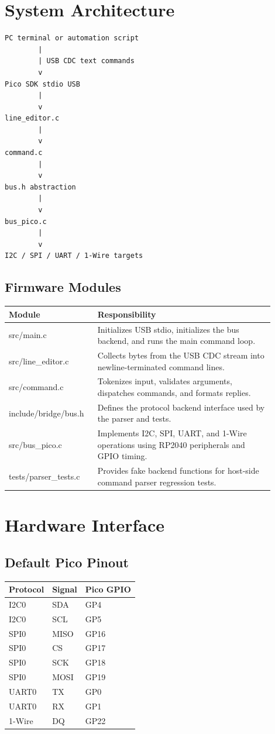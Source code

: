 \documentclass[11pt]{article}
\begin{document}
\section{System Architecture}

\begin{lstlisting}[style=bridge]
PC terminal or automation script
        |
        | USB CDC text commands
        v
Pico SDK stdio USB
        |
        v
line_editor.c
        |
        v
command.c
        |
        v
bus.h abstraction
        |
        v
bus_pico.c
        |
        v
I2C / SPI / UART / 1-Wire targets
\end{lstlisting}

\subsection{Firmware Modules}

\begin{longtable}{>{\ttfamily}p{0.28\linewidth}p{0.62\linewidth}}
\toprule
Module & Responsibility \\
\midrule
src/main.c & Initializes USB stdio, initializes the bus backend, and runs the main command loop. \\
src/line\_editor.c & Collects bytes from the USB CDC stream into newline-terminated command lines. \\
src/command.c & Tokenizes input, validates arguments, dispatches commands, and formats replies. \\
include/bridge/bus.h & Defines the protocol backend interface used by the parser and tests. \\
src/bus\_pico.c & Implements I2C, SPI, UART, and 1-Wire operations using RP2040 peripherals and GPIO timing. \\
tests/parser\_tests.c & Provides fake backend functions for host-side command parser regression tests. \\
\bottomrule
\end{longtable}

\section{Hardware Interface}

\subsection{Default Pico Pinout}

\begin{longtable}{lll}
\toprule
Protocol & Signal & Pico GPIO \\
\midrule
I2C0 & SDA & GP4 \\
I2C0 & SCL & GP5 \\
SPI0 & MISO & GP16 \\
SPI0 & CS & GP17 \\
SPI0 & SCK & GP18 \\
SPI0 & MOSI & GP19 \\
UART0 & TX & GP0 \\
UART0 & RX & GP1 \\
1-Wire & DQ & GP22 \\
\bottomrule
\end{longtable}
\end{document}

